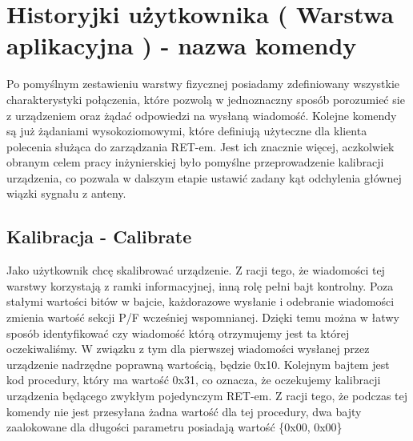 	\section{Historyjki użytkownika ( Warstwa aplikacyjna ) - nazwa komendy}
		Po pomyślnym zestawieniu warstwy fizycznej posiadamy zdefiniowany wszystkie charakterystyki połączenia, które pozwolą w jednoznaczny sposób porozumieć sie z urządzeniem oraz żądać odpowiedzi na wysłaną wiadomość.
		Kolejne komendy są już żądaniami wysokoziomowymi, które definiują użyteczne dla klienta polecenia służąca do zarządzania RET-em. Jest ich znacznie więcej, aczkolwiek obranym celem pracy inżynierskiej było pomyślne przeprowadzenie
		kalibracji urządzenia, co pozwala w dalszym etapie ustawić zadany kąt odchylenia głównej wiązki sygnału z anteny.
		\subsection{Kalibracja - Calibrate}
			Jako użytkownik chcę skalibrować urządzenie.
			\newline\newline
			Z racji tego, że wiadomości tej warstwy korzystają z ramki informacyjnej, inną rolę pełni bajt kontrolny. Poza stałymi wartości bitów w bajcie, każdorazowe wysłanie i odebranie wiadomości zmienia wartość sekcji P/F wcześniej wspomnianej. Dzięki temu można w łatwy sposób identyfikować czy wiadomość którą otrzymujemy jest ta której oczekiwaliśmy. W związku z tym dla pierwszej wiadomości wysłanej przez urządzenie nadrzędne poprawną wartością, będzie
			0x10.
			\newline
			Kolejnym bajtem jest kod procedury, który ma wartość 0x31, co oznacza, że oczekujemy kalibracji urządzenia będącego zwykłym pojedynczym RET-em.
			\newline
			Z racji tego, że podczas tej komendy nie jest przesyłana żadna wartość dla tej procedury, dwa bajty zaalokowane dla długości parametru posiadają wartość \{0x00, 0x00\}
